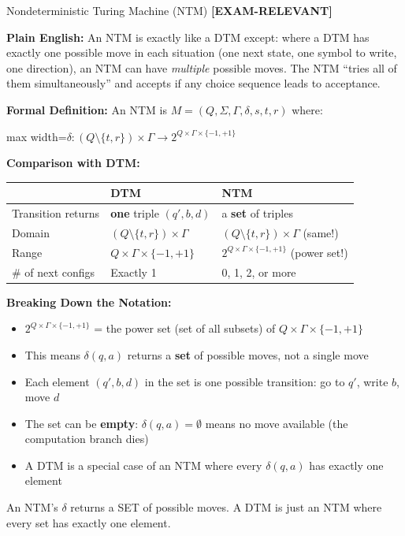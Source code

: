 \documentclass[11pt,a4paper]{article}
\newcommand{\fitmath}[1]{\begin{adjustbox}{max width=\linewidth}$\displaystyle #1$\end{adjustbox}}
\newcommand{\kemark}{\textcolor{red!70!black}{\textbf{[EXAM-RELEVANT]}}}
\newcommand{\kt}[1]{\par\vspace{0.3em}\colorbox{yellow!60}{\parbox{\dimexpr\linewidth-2\fboxsep}{#1}}\vspace{0.3em}}
\begin{document}
\begin{definitionbox}{Nondeterministic Turing Machine (NTM) \kemark}

\textbf{Plain English:}
An NTM is exactly like a DTM except: where a DTM has exactly one possible move in each situation (one next state, one symbol to write, one direction), an NTM can have \textit{multiple} possible moves. The NTM ``tries all of them simultaneously'' and accepts if any choice sequence leads to acceptance.

\textbf{Formal Definition:}
An NTM is $M = (Q, \Sigma, \Gamma, \delta, s, t, r)$ where:
\fitmath{\delta: (Q \setminus \{t,r\}) \times \Gamma \to 2^{Q \times \Gamma \times \{-1, +1\}}}

\textbf{Comparison with DTM:}
\begin{center}
\begin{tabular}{lll}
\toprule
& \textbf{DTM} & \textbf{NTM} \\
\midrule
Transition returns & \textbf{one} triple $(q', b, d)$ & a \textbf{set} of triples \\
Domain & $(Q \setminus \{t,r\}) \times \Gamma$ & $(Q \setminus \{t,r\}) \times \Gamma$ (same!) \\
Range & $Q \times \Gamma \times \{-1,+1\}$ & $2^{Q \times \Gamma \times \{-1,+1\}}$ (power set!) \\
\# of next configs & Exactly 1 & 0, 1, 2, or more \\
\bottomrule
\end{tabular}
\end{center}

\textbf{Breaking Down the Notation:}
\begin{itemize}[nosep]
\item $2^{Q \times \Gamma \times \{-1,+1\}}$ = the power set (set of all subsets) of $Q \times \Gamma \times \{-1,+1\}$
\item This means $\delta(q, a)$ returns a \textbf{set} of possible moves, not a single move
\item Each element $(q', b, d)$ in the set is one possible transition: go to $q'$, write $b$, move $d$
\item The set can be \textbf{empty}: $\delta(q, a) = \emptyset$ means no move available (the computation branch dies)
\item A DTM is a special case of an NTM where every $\delta(q, a)$ has exactly one element
\end{itemize}

\kt{An NTM's $\delta$ returns a SET of possible moves. A DTM is just an NTM where every set has exactly one element.}
\end{definitionbox}
\end{document}
